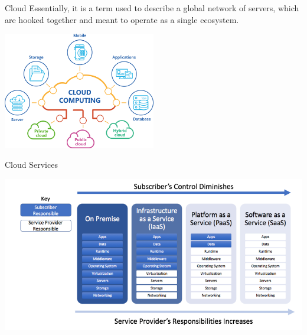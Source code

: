 \begin{frame}{Cloud}
    Essentially, it is a term used to describe a global network of servers, which are hooked together and meant to operate as a single ecosystem.
    \begin{center}
        \includegraphics[width=0.5\textwidth]{img/cloud-computing.png}
    \end{center}
\end{frame}

\begin{frame}{Cloud Services}
    \begin{center}
        \includegraphics{img/cloud-services-model.png}
    \end{center}
\end{frame}

